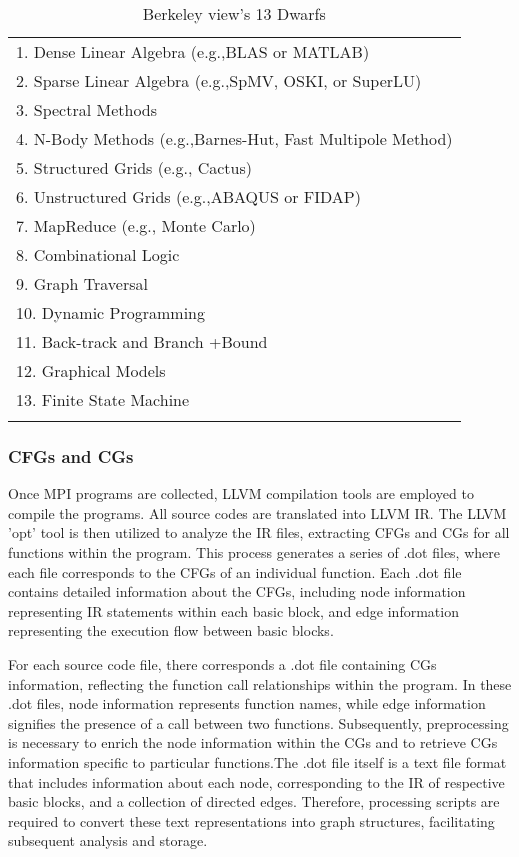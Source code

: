 \documentclass[lineno,sn-mathphys]{sn-jnl}%
\theoremstyle{thmstyleone}%
\theoremstyle{thmstyletwo}%
\theoremstyle{thmstylethree}%
\begin{document}
\begin{table*}[h]    
    \centering
    \captionsetup{justification=centering}
    \caption{Berkeley view's 13 Dwarfs}\label{13dwarfs}%
    \begin{tabular}{@{}l@{}}
    \toprule
     \midrule
     1. Dense Linear Algebra (e.g.,BLAS or MATLAB)\\
     2. Sparse Linear Algebra (e.g.,SpMV, OSKI, or SuperLU)\\
     3. Spectral Methods \\
     4. N-Body Methods (e.g.,Barnes-Hut, Fast Multipole Method)\\
     5. Structured Grids (e.g., Cactus)\\
     6. Unstructured Grids (e.g.,ABAQUS or FIDAP)\\
     7. MapReduce (e.g., Monte Carlo)\\
     8. Combinational Logic\\
     9. Graph Traversal\\
     10. Dynamic Programming\\
     11. Back-track and Branch +Bound\\
     12. Graphical Models\\
     13. Finite State Machine\\
    \botrule
    \end{tabular}
\end{table*}
\subsubsection{CFGs and CGs}
Once MPI programs are collected, LLVM compilation tools are employed to compile the programs. All source codes are translated into LLVM IR. The LLVM 'opt' tool is then utilized to analyze the IR files, extracting CFGs and CGs for all functions within the program. This process generates a series of .dot files, where each file corresponds to the CFGs of an individual function. Each .dot file contains detailed information about the CFGs, including node information representing IR statements within each basic block, and edge information representing the execution flow between basic blocks.\par
For each source code file, there corresponds a .dot file containing CGs information, reflecting the function call relationships within the program. In these .dot files, node information represents function names, while edge information signifies the presence of a call between two functions. Subsequently, preprocessing is necessary to enrich the node information within the CGs and to retrieve CGs information specific to particular functions.The .dot file itself is a text file format that includes information about each node, corresponding to the IR of respective basic blocks, and a collection of directed edges. Therefore, processing scripts are required to convert these text representations into graph structures, facilitating subsequent analysis and storage.
\end{document}
